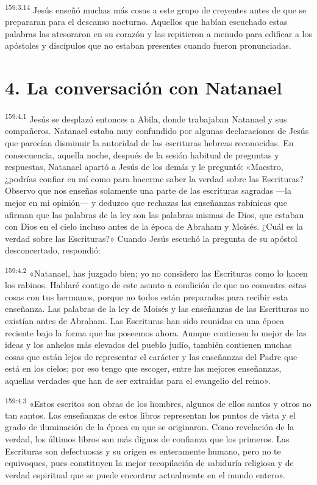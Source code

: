 \par
\textsuperscript{159:3.14} Jesús enseñó muchas más cosas a este grupo de creyentes antes de que se prepararan para el descanso nocturno. Aquellos que habían escuchado estas palabras las atesoraron en su corazón y las repitieron a menudo para edificar a los apóstoles y discípulos que no estaban presentes cuando fueron pronunciadas.

\section*{4. La conversación con Natanael}
\par
\textsuperscript{159:4.1} Jesús se desplazó entonces a Abila, donde trabajaban Natanael y sus compañeros. Natanael estaba muy confundido por algunas declaraciones de Jesús que parecían disminuir la autoridad de las escrituras hebreas reconocidas. En consecuencia, aquella noche, después de la sesión habitual de preguntas y respuestas, Natanael apartó a Jesús de los demás y le preguntó: «Maestro, ¿podrías confiar en mí como para hacerme saber la verdad sobre las Escrituras? Observo que nos enseñas solamente una parte de las escrituras sagradas ---la mejor en mi opinión--- y deduzco que rechazas las enseñanzas rabínicas que afirman que las palabras de la ley son las palabras mismas de Dios, que estaban con Dios en el cielo incluso antes de la época de Abraham y Moisés. ¿Cuál es la verdad sobre las Escrituras?» Cuando Jesús escuchó la pregunta de su apóstol desconcertado, respondió:

\par
\textsuperscript{159:4.2} «Natanael, has juzgado bien; yo no considero las Escrituras como lo hacen los rabinos. Hablaré contigo de este asunto a condición de que no comentes estas cosas con tus hermanos, porque no todos están preparados para recibir esta enseñanza. Las palabras de la ley de Moisés y las enseñanzas de las Escrituras no existían antes de Abraham. Las Escrituras han sido reunidas en una época reciente bajo la forma que las poseemos ahora. Aunque contienen lo mejor de las ideas y los anhelos más elevados del pueblo judío, también contienen muchas cosas que están lejos de representar el carácter y las enseñanzas del Padre que está en los cielos; por eso tengo que escoger, entre las mejores enseñanzas, aquellas verdades que han de ser extraídas para el evangelio del reino».

\par
\textsuperscript{159:4.3} «Estos escritos son obras de los hombres, algunos de ellos santos y otros no tan santos. Las enseñanzas de estos libros representan los puntos de vista y el grado de iluminación de la época en que se originaron. Como revelación de la verdad, los últimos libros son más dignos de confianza que los primeros. Las Escrituras son defectuosas y su origen es enteramente humano, pero no te equivoques, pues constituyen la mejor recopilación de sabiduría religiosa y de verdad espiritual que se puede encontrar actualmente en el mundo entero».

